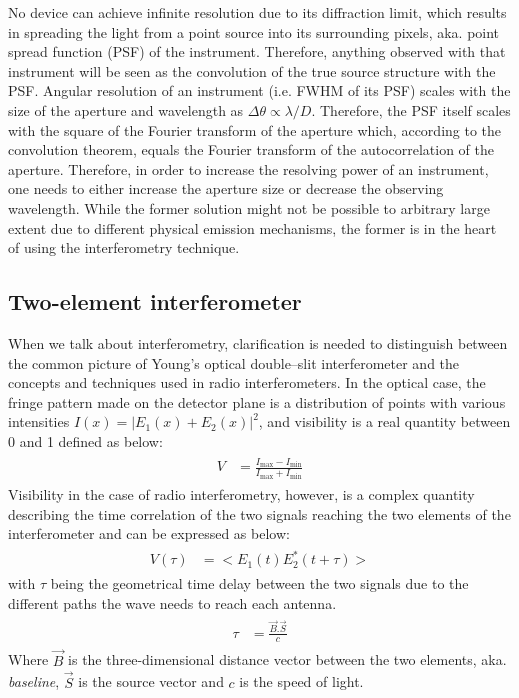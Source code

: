 \documentclass[paper=a4, fontsize=11pt]{scrartcl} %
\numberwithin{equation}{section} %
\numberwithin{figure}{section} %
\numberwithin{table}{section} %
\begin{document}
No device can achieve infinite resolution due to its diffraction limit, which results in spreading the light from a point source into its surrounding pixels, aka. point spread function (PSF) of the instrument. Therefore, anything observed with that instrument will be seen as the convolution of the true source structure with the PSF. Angular resolution of an instrument (i.e. FWHM of its PSF) scales with the size of the aperture and wavelength as $\Delta\theta \propto \lambda / D$. Therefore, the PSF itself scales with the square of the Fourier transform of the aperture which, according to the convolution theorem, equals the Fourier transform of the autocorrelation of the aperture. Therefore, in order to increase the resolving power of an instrument, one needs to either increase the aperture size or decrease the observing wavelength. While the former solution might not be possible to arbitrary large extent due to different physical emission mechanisms, the former is in the heart of using the interferometry technique.    
 
\subsection{Two-element interferometer}
When we talk about interferometry, clarification is needed to distinguish between the common picture of Young's optical double--slit interferometer and the concepts and techniques used in radio interferometers. In the optical case, the fringe pattern made on the detector plane is a distribution of points with various intensities $I(x) = |E_1(x) + E_2(x)|^2$, and visibility is a real quantity between 0 and 1 defined as below:
\begin{align} 
\begin{split}
V &= \frac{I_\mathrm{max} - I_\mathrm{min}}{I_\mathrm{max} + I_\mathrm{min}}
\end{split}                    
\end{align}
Visibility in the case of radio interferometry, however, is a complex quantity describing the time correlation of the two signals reaching the two elements of the interferometer and can be expressed as below:
\begin{align} 
\begin{split}
\label{eq:vis_def}
V(\tau) &= <E_1(t)E_2^*(t+\tau)>
\end{split}                    
\end{align}
with $\tau$ being the geometrical time delay between the two signals due to the different paths the wave needs to reach each antenna.
\begin{align} 
\begin{split}
\tau &= \frac{\vec{B}.\vec{S}}{c}
\end{split}                    
\end{align}
Where $\vec{B}$ is the three-dimensional distance vector between the two elements, aka. \emph{baseline}, $\vec{S}$ is the source vector and $c$ is the speed of light.
\end{document}
